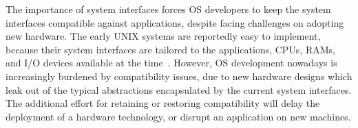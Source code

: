 The importance of system interfaces forces OS developers to keep the system interfaces compatible against applications,
despite facing challenges on adopting new hardware.
The early UNIX systems are reportedly easy to implement, because
their system interfaces are tailored
to the applications, CPUs, RAMs, and I/O devices available at the time~\cite{ritchie78unix-retro}.
However, %
OS development nowadays is increasingly burdened by compatibility issues,
due to new hardware designs which leak out of the typical abstractions encapsulated by the current system interfaces.
%
The additional effort for retaining or restoring compatibility will delay the deployment of a hardware technology, or disrupt an application on new machines.

